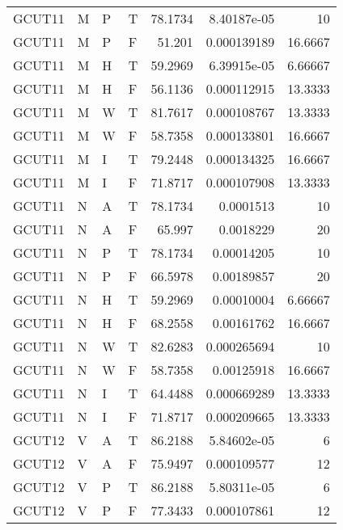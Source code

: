 \begin{longtable}{llllrrr}
    GCUT11   & M     & P     & T          & 78.1734    & 8.40187e-05 & 10       \\
    GCUT11   & M     & P     & F          & 51.201     & 0.000139189 & 16.6667  \\
    GCUT11   & M     & H     & T          & 59.2969    & 6.39915e-05 & 6.66667  \\
    GCUT11   & M     & H     & F          & 56.1136    & 0.000112915 & 13.3333  \\
    GCUT11   & M     & W     & T          & 81.7617    & 0.000108767 & 13.3333  \\
    GCUT11   & M     & W     & F          & 58.7358    & 0.000133801 & 16.6667  \\
    GCUT11   & M     & I     & T          & 79.2448    & 0.000134325 & 16.6667  \\
    GCUT11   & M     & I     & F          & 71.8717    & 0.000107908 & 13.3333  \\
    GCUT11   & N     & A     & T          & 78.1734    & 0.0001513   & 10       \\
    GCUT11   & N     & A     & F          & 65.997     & 0.0018229   & 20       \\
    GCUT11   & N     & P     & T          & 78.1734    & 0.00014205  & 10       \\
    GCUT11   & N     & P     & F          & 66.5978    & 0.00189857  & 20       \\
    GCUT11   & N     & H     & T          & 59.2969    & 0.00010004  & 6.66667  \\
    GCUT11   & N     & H     & F          & 68.2558    & 0.00161762  & 16.6667  \\
    GCUT11   & N     & W     & T          & 82.6283    & 0.000265694 & 10       \\
    GCUT11   & N     & W     & F          & 58.7358    & 0.00125918  & 16.6667  \\
    GCUT11   & N     & I     & T          & 64.4488    & 0.000669289 & 13.3333  \\
    GCUT11   & N     & I     & F          & 71.8717    & 0.000209665 & 13.3333  \\
    GCUT12   & V     & A     & T          & 86.2188    & 5.84602e-05 & 6        \\
    GCUT12   & V     & A     & F          & 75.9497    & 0.000109577 & 12       \\
    GCUT12   & V     & P     & T          & 86.2188    & 5.80311e-05 & 6        \\
    GCUT12   & V     & P     & F          & 77.3433    & 0.000107861 & 12       \\

\end{longtable}
